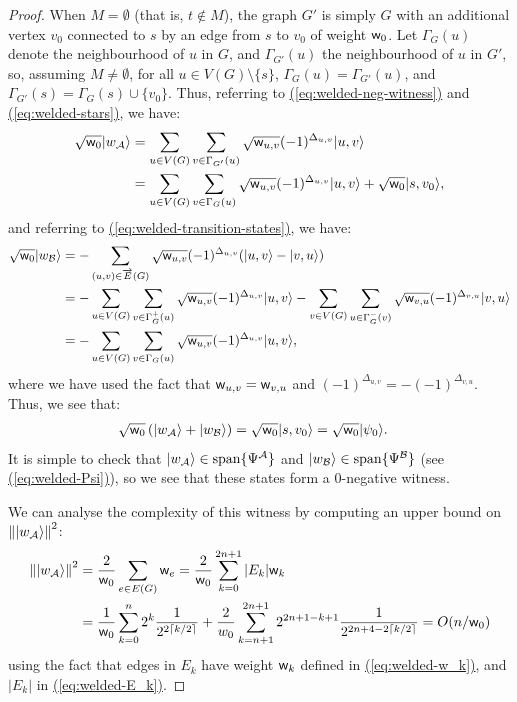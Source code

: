 \documentclass{article}
\newcommand{\eq}[1]{\hyperref[eq:#1]{(\ref*{eq:#1})}}
\def\ket#1{{\lvert}#1\rangle}
\renewcommand{\>}{\rangle}
\newcommand{\<}{\langle}
\renewcommand{\(}{\left(}
\renewcommand{\)}{\right)}
\def\norm#1{\left\| #1 \right\|}
\def\w{{\sf w}}
\begin{document}
\begin{proof}
When $M=\emptyset$ (that is, $t\not\in M$), the graph $G'$ is simply $G$ with an additional vertex $v_0$ connected to $s$ by an edge from $s$ to $v_0$ of weight $\w_0$. 
Let $\Gamma_G(u)$ denote the neighbourhood of $u$ in $G$, and $\Gamma_{G'}(u)$ the neighbourhood of $u$ in $G'$, so, assuming $M\neq \emptyset$, for all $u\in V(G)\setminus \{s\}$, $\Gamma_G(u)=\Gamma_{G'}(u)$, and $\Gamma_{G'}(s)=\Gamma_G(s)\cup\{v_0\}$.
Thus, referring to \eq{welded-neg-witness} and \eq{welded-stars}, we have: 
\begin{align*}
\sqrt{\w_0}\ket{w_{\cal A}} &= \sum_{u\in V(G)}\sum_{v\in\Gamma_{G'}(u)}\sqrt{\w_{u,v}}(-1)^{\Delta_{u,v}}\ket{u,v}\\
&=\sum_{u\in V(G)}\sum_{v\in\Gamma_G(u)}\sqrt{\w_{u,v}}(-1)^{\Delta_{u,v}}\ket{u,v}+\sqrt{\w_0}\ket{s,v_0},
\end{align*}
and referring to \eq{welded-transition-states}, we have:
\begin{align*}
\sqrt{\w_0}\ket{w_{\cal B}} &= -\sum_{(u,v)\in \overrightarrow{E}(G)}\sqrt{\w_{u,v}}(-1)^{\Delta_{u,v}}(\ket{u,v}-\ket{v,u})\\
&= -\sum_{u\in V(G)}\sum_{v\in\Gamma_G^+(u)}\sqrt{\w_{u,v}}(-1)^{\Delta_{u,v}}\ket{u,v}-\sum_{v\in V(G)}\sum_{u\in \Gamma_G^-(v)}\sqrt{\w_{v,u}}(-1)^{\Delta_{v,u}}\ket{v,u}\\
&=-\sum_{u\in V(G)}\sum_{v\in\Gamma_G(u)}\sqrt{\w_{u,v}}(-1)^{\Delta_{u,v}}\ket{u,v},
\end{align*}
where we have used the fact that $\w_{u,v}=\w_{v,u}$ and $(-1)^{\Delta_{u,v}}=-(-1)^{\Delta_{v,u}}$.
 Thus, we see that:
\begin{align*}
\sqrt{\w_0}\left(\ket{w_{\cal A}}+\ket{w_{\cal B}}\right) &= \sqrt{\w_0}\ket{s,v_0}=\sqrt{\w_0}\ket{\psi_0}. 
\end{align*}
It is simple to check that $\ket{w_{\cal A}}\in \mathrm{span}\{\Psi^{\cal A}\}$ and $\ket{w_{\cal B}}\in \mathrm{span}\{\Psi^{\cal B}\}$ (see \eq{welded-Psi}), so we see that these states form a 0-negative witness. 

We can analyse the complexity of this witness by computing an upper bound on $\norm{\ket{w_{\cal A}}}^2$:
\begin{align*}
\norm{\ket{w_{\cal A}}}^2 &= \frac{2}{\w_0}\sum_{e\in E(G)}\w_e = \frac{2}{\w_0}\sum_{k=0}^{2n+1}|E_k|\w_k\\
&=\frac{1}{\w_0}\sum_{k=0}^{n}2^{k}\frac{1}{2^{2\lceil k/2\rceil}}+\frac{2}{w_0}\sum_{k=n+1}^{2n+1}2^{2n+1-k+1}\frac{1}{2^{2n+4-2\lceil k/2\rceil}}=O(n/\w_0)\label{eq:welded-trees-neg}
\end{align*}
using the fact that edges in $E_k$ have weight $\w_k$ defined in \eq{welded-w_k}, and $|E_k|$ in \eq{welded-E_k}.
\end{proof}
\end{document}
